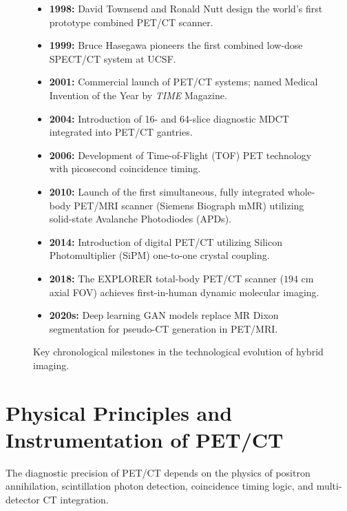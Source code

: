 \documentclass[11pt,a4paper]{article}
\begin{document}
\begin{figure}[htbp]
\centering
\begin{tcolorbox}[colback=teal!5!white,colframe=teal!60!black,title=\textbf{Chronological Milestones in the Evolution of Hybrid Imaging},width=\linewidth]
\small
\begin{itemize}[leftmargin=1.5em]
    \item \textbf{1998:} David Townsend and Ronald Nutt design the world's first prototype combined PET/CT scanner.
    \item \textbf{1999:} Bruce Hasegawa pioneers the first combined low-dose SPECT/CT system at UCSF.
    \item \textbf{2001:} Commercial launch of PET/CT systems; named Medical Invention of the Year by \textit{TIME} Magazine.
    \item \textbf{2004:} Introduction of 16- and 64-slice diagnostic MDCT integrated into PET/CT gantries.
    \item \textbf{2006:} Development of Time-of-Flight (TOF) PET technology with picosecond coincidence timing.
    \item \textbf{2010:} Launch of the first simultaneous, fully integrated whole-body PET/MRI scanner (Siemens Biograph mMR) utilizing solid-state Avalanche Photodiodes (APDs).
    \item \textbf{2014:} Introduction of digital PET/CT utilizing Silicon Photomultiplier (SiPM) one-to-one crystal coupling.
    \item \textbf{2018:} The EXPLORER total-body PET/CT scanner ($194\text{ cm}$ axial FOV) achieves first-in-human dynamic molecular imaging.
    \item \textbf{2020s:} Deep learning GAN models replace MR Dixon segmentation for pseudo-CT generation in PET/MRI.
\end{itemize}
\end{tcolorbox}
\caption{Key chronological milestones in the technological evolution of hybrid imaging.}
\label{fig:hybrid_milestones}
\end{figure}

\section{Physical Principles and Instrumentation of PET/CT}
The diagnostic precision of PET/CT depends on the physics of positron annihilation, scintillation photon detection, coincidence timing logic, and multi-detector CT integration.
\end{document}
